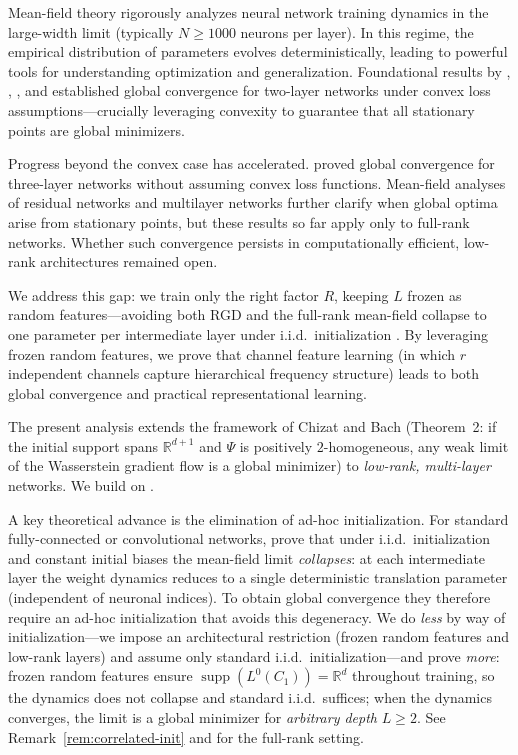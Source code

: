 \documentclass[nohyperref]{article}
\theoremstyle{plain}
\theoremstyle{definition}
\theoremstyle{remark}
\begin{document}
Mean-field theory rigorously analyzes neural network training dynamics in the large-width limit (typically $N \ge 1000$ neurons per layer). In this regime, the empirical distribution of parameters evolves deterministically, leading to powerful tools for understanding optimization and generalization. Foundational results by \cite{mei2018mean}, \cite{chizat2018globalconvergencegradientdescent}, \cite{rotskoff2019neural}, and \cite{wei2019regularization} established global convergence for two-layer networks under convex loss assumptions—crucially leveraging convexity to guarantee that all stationary points are global minimizers.

Progress beyond the convex case has accelerated. \cite{pham2021globalconvergencethreelayerneural} proved global convergence for three-layer networks without assuming convex loss functions. Mean-field analyses of residual networks \cite{lu2020mean} and multilayer networks \cite{sirignano2019mean} further clarify when global optima arise from stationary points, but these results so far apply only to full-rank networks. Whether such convergence persists in computationally efficient, low-rank architectures remained open.

We address this gap: we train only the right factor $R$, keeping $L$ frozen as random features---avoiding both RGD and the full-rank mean-field collapse to one parameter per intermediate layer under i.i.d.\ initialization \cite{nguyen2023rigorousframeworkmeanfield}. By leveraging frozen random features, we prove that channel feature learning (in which $r$ independent channels capture hierarchical frequency structure) leads to both global convergence and practical representational learning.

The present analysis extends the framework of Chizat and Bach \cite{chizat2018globalconvergencegradientdescent} (Theorem~2: if the initial support spans $\mathbb{R}^{d+1}$ and $\Psi$ is positively $2$-homogeneous, any weak limit of the Wasserstein gradient flow is a global minimizer) to \emph{low-rank, multi-layer} networks. We build on \cite{pham2021globalconvergencethreelayerneural,nguyen2023rigorousframeworkmeanfield}.

A key theoretical advance is the elimination of ad-hoc initialization. For standard fully-connected or convolutional networks, \cite{nguyen2023rigorousframeworkmeanfield} prove that under i.i.d.\ initialization and constant initial biases the mean-field limit \emph{collapses}: at each intermediate layer the weight dynamics reduces to a single deterministic translation parameter (independent of neuronal indices). To obtain global convergence they therefore require an ad-hoc initialization that avoids this degeneracy. We do \emph{less} by way of initialization---we impose an architectural restriction (frozen random features and low-rank layers) and assume only standard i.i.d.\ initialization---and prove \emph{more}: frozen random features ensure $\operatorname{supp}(L^0(C_1)) = \mathbb{R}^d$ throughout training, so the dynamics does not collapse and standard i.i.d.\ suffices; when the dynamics converges, the limit is a global minimizer for \emph{arbitrary depth} $L \ge 2$. See Remark~\ref{rem:correlated-init} and \cite{nguyen2023rigorousframeworkmeanfield} for the full-rank setting.
\end{document}
